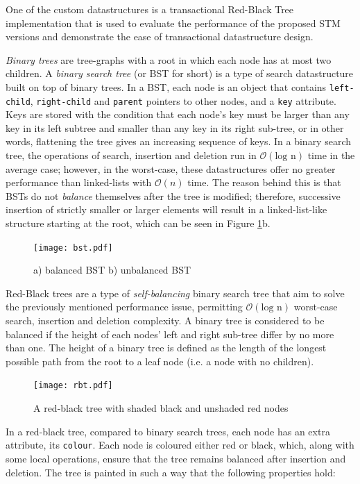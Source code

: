 One of the custom datastructures is a transactional Red-Black Tree implementation that is used to evaluate the performance of the proposed STM versions and demonstrate the ease of transactional datastructure design.

\textit{Binary trees} are tree-graphs with a root in which each node has at most two children. A \textit{binary search tree} (or BST for short) is a type of search datastructure built on top of binary trees. In a BST, each node is an object that contains \texttt{left-child}, \texttt{right-child} and \texttt{parent} pointers to other nodes, and a \texttt{key} attribute. Keys are stored with the condition that each node's key must be larger than any key in its left subtree and smaller than any key in its right sub-tree, or in other words, flattening the tree gives an increasing sequence of keys. In a binary search tree, the operations of search, insertion and deletion run in $\mathcal{O}(\text{log n})$ time in the average case; however, in the worst-case, these datastructures offer no greater performance than linked-lists with $\mathcal{O}(n)$ time\cite{introalg}. The reason behind this is that BSTs do not \textit{balance} themselves after the tree is modified; therefore, successive insertion of strictly smaller or larger elements will result in a linked-list-like structure starting at the root, which can be seen in Figure \ref{fig:bst}b.

\begin{figure}[!htb]
    \centering
    \texttt{[image: bst.pdf]}
    \caption{a) balanced BST b) unbalanced BST}
    \label{fig:bst}
\end{figure}

Red-Black trees are a type of \textit{self-balancing} binary search tree that aim to solve the previously mentioned performance issue, permitting $\mathcal{O}(\text{log n})$ worst-case search, insertion and deletion complexity\cite{introalg}. A binary tree is considered to be balanced if the height of each nodes' left and right sub-tree differ by no more than one. The height of a binary tree is defined as the length of the longest possible path from the root to a leaf node (i.e. a node with no children).

\begin{figure}[!htb]
    \centering
    \texttt{[image: rbt.pdf]}
    \caption{A red-black tree with shaded black and unshaded red nodes}
    \label{fig:rbt}
\end{figure}

In a red-black tree, compared to binary search trees, each node has an extra attribute, its \texttt{colour}. Each node is coloured either red or black, which, along with some local  operations, ensure that the tree remains balanced after insertion and deletion. The tree is painted in such a way that the following properties hold\cite{introalg}:

